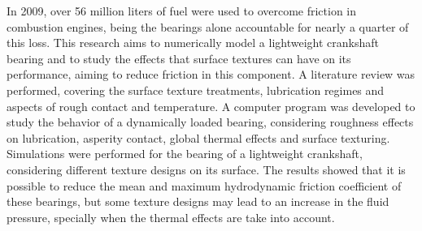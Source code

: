 In 2009, over 56 million liters of fuel were used to overcome friction in combustion engines, being the bearings alone accountable for nearly a quarter of this loss. This research aims to numerically model a lightweight crankshaft bearing and to study the effects that surface textures can have on its performance, aiming to reduce friction in this component.  A literature review was performed, covering the surface texture treatments, lubrication regimes and aspects of rough contact and temperature. A computer program was developed to study the behavior of a dynamically loaded bearing, considering roughness effects on lubrication, asperity contact, global thermal effects and surface texturing. Simulations were performed for the bearing of a lightweight crankshaft, considering different texture designs on its surface. The results showed that it is possible to reduce the mean and maximum hydrodynamic friction coefficient of these bearings, but some texture designs may lead to an increase in the fluid pressure, specially when the thermal effects are take into account.